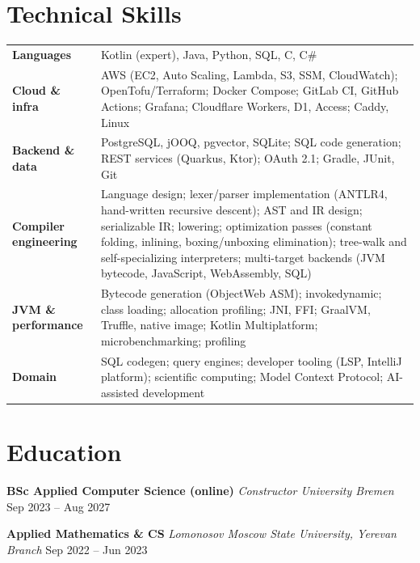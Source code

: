 \documentclass[10pt,a4paper]{article}
\newcommand{\role}[4]{%
  \needspace{4\baselineskip}%
  \noindent\textbf{#1} \textemdash{} \textit{#2} \hfill {\small\color{subtle}#3}\\[-0.25em]
  {\small\color{subtle}#4}\par\vspace{0.1em}
}
\begin{document}
\section*{Technical Skills}

\noindent
\small
\begin{tabular}{@{}p{3.4cm}@{\hspace{0.5em}}p{14cm}@{}}
\textbf{Languages} & Kotlin (expert), Java, Python, SQL, C, C\# \\[0.2em]
\textbf{Cloud \& infra} & AWS (EC2, Auto Scaling, Lambda, S3, SSM, CloudWatch); OpenTofu\slash Terraform; Docker Compose; GitLab CI, GitHub Actions; Grafana; Cloudflare Workers, D1, Access; Caddy, Linux \\[0.2em]
\textbf{Backend \& data} & PostgreSQL, jOOQ, pgvector, SQLite; SQL code generation; REST services (Quarkus, Ktor); OAuth 2.1; Gradle, JUnit, Git \\[0.2em]
\textbf{Compiler engineering} & Language design; lexer/parser implementation (ANTLR4, hand-written recursive descent); AST and IR design; serializable IR; lowering; optimization passes (constant folding, inlining, boxing/unboxing elimination); tree-walk and self-specializing interpreters; multi-target backends (JVM bytecode, JavaScript, WebAssembly, SQL) \\[0.2em]
\textbf{JVM \& performance} & Bytecode generation (ObjectWeb ASM); invokedynamic; class loading; allocation profiling; JNI, FFI; GraalVM, Truffle, native image; Kotlin Multiplatform; microbenchmarking; profiling \\[0.2em]
\textbf{Domain} & SQL codegen; query engines; developer tooling (LSP, IntelliJ platform); scientific computing; Model Context Protocol; AI-assisted development \\
\end{tabular}
\normalsize

\section*{Education}

\role{BSc Applied Computer Science (online)}{Constructor University Bremen}{Sep 2023 -- Aug 2027}{}

\role{Applied Mathematics \& CS}{Lomonosov Moscow State University, Yerevan Branch}{Sep 2022 -- Jun 2023}{}

\end{document}
